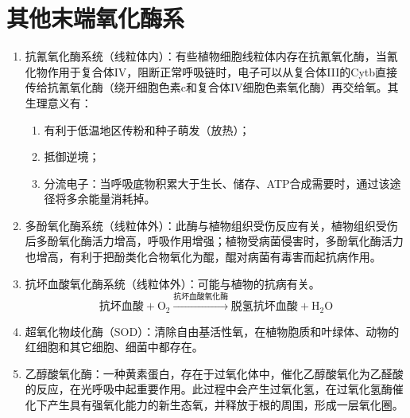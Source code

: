 \section{其他末端氧化酶系}
\begin{enumerate}
    \item 抗氰氧化酶系统（线粒体内）：有些植物细胞线粒体内存在抗氰氧化酶，当氰化物作用于复合体IV，阻断正常呼吸链时，电子可以从复合体III的Cytb直接传给抗氰氧化酶（绕开细胞色素c和复合体IV细胞色素氧化酶）再交给氧。其生理意义有：
    \begin{enumerate}
        \item 有利于低温地区传粉和种子萌发（放热）；
        \item 抵御逆境；
        \item 分流电子：当呼吸底物积累大于生长、储存、ATP合成需要时，通过该途径将多余能量消耗掉。
    \end{enumerate}
    \item 多酚氧化酶系统（线粒体外）：此酶与植物组织受伤反应有关，植物组织受伤后多酚氧化酶活力增高，呼吸作用增强；植物受病菌侵害时，多酚氧化酶活力也增高，有利于把酚类化合物氧化为醌，醌对病菌有毒害而起抗病作用。
    \item 抗坏血酸氧化酶系统（线粒体外）：可能与植物的抗病有关。
    \[
        \text{抗坏血酸}+\text{O}_2\overset{\text{抗坏血酸氧化酶}}\longrightarrow\text{脱氢抗坏血酸}+\text{H}_2\text{O}
    \]
    \item 超氧化物歧化酶（SOD）：清除自由基活性氧，在植物胞质和叶绿体、动物的红细胞和其它细胞、细菌中都存在。
    \item 乙醇酸氧化酶：一种黄素蛋白，存在于过氧化体中，催化乙醇酸氧化为乙醛酸的反应，在光呼吸中起重要作用。此过程中会产生过氧化氢，在过氧化氢酶催化下产生具有强氧化能力的新生态氧，并释放于根的周围，形成一层氧化圈。
\end{enumerate}